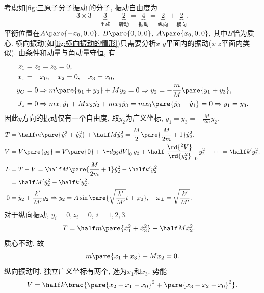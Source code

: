 \documentclass{ctexart}
\begin{document}
\begin{sample}
    \begin{ex}[三原子分子振动]
        考虑如\cref{fig:三原子分子振动}的分子, 振动自由度为
        \[ 3\times 3 - \underbrace{3}_{\text{平动}} - \underbrace{2}_{\text{转动}} = \underbrace{4}_{\text{振动}} = \underbrace{2}_{\text{纵向}}+\underbrace{2}_{\text{横向}}. \]
        平衡位置在$A\pare{-x_0,0,0}$, $B\pare{0,0,0}$, $A\pare{x_0,0,0}$, 其中$B$恰为质心. 横向振动(如\cref{fig:横向振动的情形})只需要分析$x$-$y$平面内的振动($x$-$z$平面内类似). 由条件和动量与角动量守恒, 有
        \begin{align*}
            z_1 &= z_2 = z_3 = 0, \\
            x_1 &= -x_0,\quad x_2 = 0,\quad x_3 = x_0, \\
            y_C &= 0 \Rightarrow m\pare{y_1+y_3} + My_2 = 0 \Rightarrow y_2 = -\frac{m}{M}\pare{y_1+y_3}, \\
            J_z &= 0 \Rightarrow mx_1\dot{y_1} + Mx_2\dot{y_2} + mx_3\dot{y}_3 = mx_0 \pare{\dot{y}_3 - \dot{y}_1} = 0 \Rightarrow y_1 = y_3.
        \end{align*}
        因此$y$方向的振动仅有一个自由度, 取$y_2$为广义坐标, $\displaystyle y_1 = y_3 = -\frac{M}{2m}y_2$.
        \begin{align*}
            T &= \half m\pare{\dot{y}_1^2 + \dot{y}_3^2} + \half M\dot{y}_2^2 = \frac{M}{2}\pare{\frac{M}{2m}+1}\dot{y}_2^2. \\
            V &= V\pare{y_2} = V\pare{0} + \left.\+d{y_2}dV\right\vert_{0}y_2 + \half \left.\frac{\rd{^2V}}{\rd{y_2^2}}\right\vert_{0} y_2^2 + \cdots = \half k'y_2^2. \\
            L &= T-V = \half M\pare{\frac{M}{2m}+1}\dot{y}_2^2 - \half k' y_2^2 \\
            &= \half M'\dot{y}_2^2 - \half k' y_2^2. \\
            0 &= \ddot{y}_2 + \frac{k'}{M'}y_2 \Rightarrow y_2 = A\sin\pare{\sqrt{\frac{k'}{M'}}t + \varphi_0},\quad \omega_{\perp} = \sqrt{\frac{k'}{M'}}.
        \end{align*}
        对于纵向振动, $y_i = 0, z_i = 0$, $i = 1,2,3$.
        \begin{align*}
            T &= \half m\pare{\dot{x}_1^2 + \dot{x}_3^2} - \half M\dot{x}_2^2.
        \end{align*}
        质心不动, 故
        \[ m\pare{x_1+x_3} + Mx_2 = 0. \]
        纵向振动时, 独立广义坐标有两个, 选为$x_1$和$x_3$. 势能
        \[ V = \half k\brac{\pare{x_2-x_1-x_0}^2 + \pare{x_3-x_2-x_0}^2}. \]

\end{ex}
\end{sample}
\end{document}
